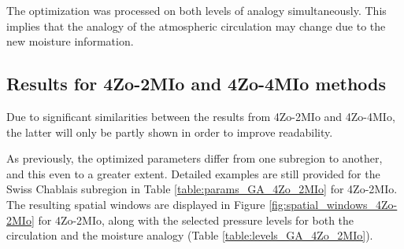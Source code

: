 \documentclass[5p]{elsarticle}
\begin{document}
The optimization was processed on both levels of analogy simultaneously. This implies that the analogy of the atmospheric circulation may change due to the new moisture information.


\subsection{Results for 4Zo-2MIo and 4Zo-4MIo methods}

Due to significant similarities between the results from 4Zo-2MIo and 4Zo-4MIo, the latter will only be partly shown in order to improve readability.

As previously, the optimized parameters differ from one subregion to another, and this even to a greater extent. Detailed examples are still provided for the Swiss Chablais subregion in Table \ref{table:params_GA_4Zo_2MIo} for 4Zo-2MIo. The resulting spatial windows are displayed in Figure \ref{fig:spatial_windows_4Zo-2MIo} for 4Zo-2MIo, along with the selected pressure levels for both the circulation and the moisture analogy (Table \ref{table:levels_GA_4Zo_2MIo}). 
\end{document}
